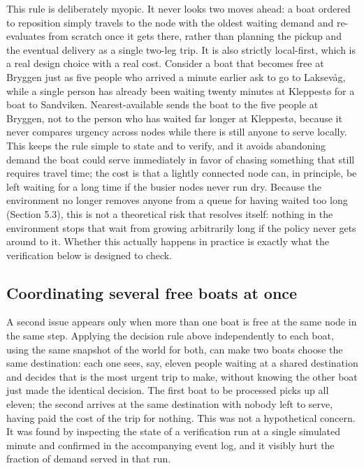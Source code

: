 \documentclass[11pt,a4paper]{article}
\begin{document}
This rule is deliberately myopic. It never looks two moves ahead: a boat ordered to reposition simply travels to the node with the oldest waiting demand and re-evaluates from scratch once it gets there, rather than planning the pickup and the eventual delivery as a single two-leg trip. It is also strictly local-first, which is a real design choice with a real cost. Consider a boat that becomes free at Bryggen just as five people who arrived a minute earlier ask to go to Laksevåg, while a single person has already been waiting twenty minutes at Kleppestø for a boat to Sandviken. Nearest-available sends the boat to the five people at Bryggen, not to the person who has waited far longer at Kleppestø, because it never compares urgency across nodes while there is still anyone to serve locally. This keeps the rule simple to state and to verify, and it avoids abandoning demand the boat could serve immediately in favor of chasing something that still requires travel time; the cost is that a lightly connected node can, in principle, be left waiting for a long time if the busier nodes never run dry. Because the environment no longer removes anyone from a queue for having waited too long (Section 5.3), this is not a theoretical risk that resolves itself: nothing in the environment stops that wait from growing arbitrarily long if the policy never gets around to it. Whether this actually happens in practice is exactly what the verification below is designed to check.

\subsection{Coordinating several free boats at once}
\label{sec:asignar-flota}

A second issue appears only when more than one boat is free at the same node in the same step. Applying the decision rule above independently to each boat, using the same snapshot of the world for both, can make two boats choose the same destination: each one sees, say, eleven people waiting at a shared destination and decides that is the most urgent trip to make, without knowing the other boat just made the identical decision. The first boat to be processed picks up all eleven; the second arrives at the same destination with nobody left to serve, having paid the cost of the trip for nothing. This was not a hypothetical concern. It was found by inspecting the state of a verification run at a single simulated minute and confirmed in the accompanying event log, and it visibly hurt the fraction of demand served in that run.
\end{document}
